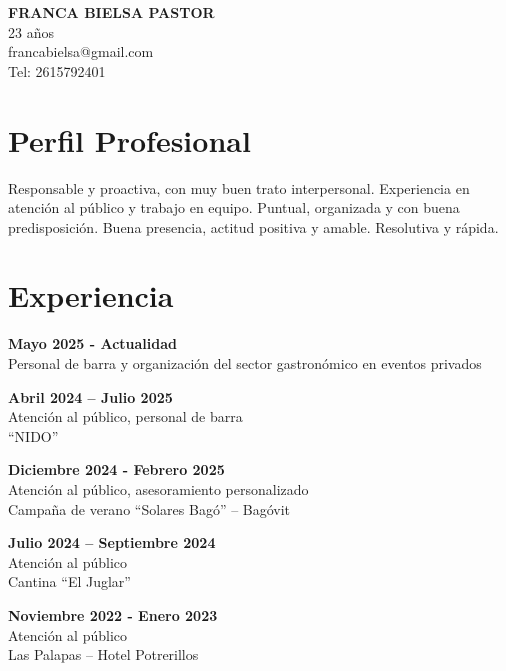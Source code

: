 \documentclass[11pt,a4paper]{article}
\begin{document}
\begin{center}
    {\LARGE \textbf{FRANCA BIELSA PASTOR}}\\[5pt]
    23 años \\
    francabielsa@gmail.com \\
    Tel: 2615792401
\end{center}

\vspace{10pt}

\section*{Perfil Profesional}
Responsable y proactiva, con muy buen trato interpersonal. Experiencia en atención al público y trabajo en equipo. Puntual, organizada y con buena predisposición. Buena presencia, actitud positiva y amable. Resolutiva y rápida.

\section*{Experiencia}

\textbf{Mayo 2025 - Actualidad} \\
Personal de barra y organización del sector gastronómico en eventos privados

\vspace{5pt}

\textbf{Abril 2024 – Julio 2025} \\
Atención al público, personal de barra \\
“NIDO”

\vspace{5pt}

\textbf{Diciembre 2024 - Febrero 2025} \\
Atención al público, asesoramiento personalizado \\
Campaña de verano “Solares Bagó” – Bagóvit

\vspace{5pt}

\textbf{Julio 2024 – Septiembre 2024} \\
Atención al público \\
Cantina “El Juglar”

\vspace{5pt}

\textbf{Noviembre 2022 - Enero 2023} \\
Atención al público \\
Las Palapas – Hotel Potrerillos
\end{document}
